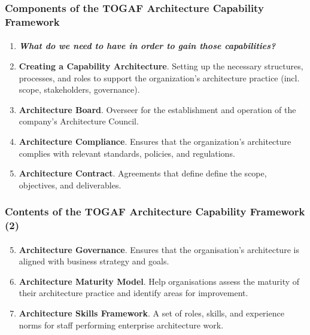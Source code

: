 \documentclass[aspectratio=169, table]{beamer}
\begin{document}
	\begin{frame}
		\frametitle{Components of the TOGAF Architecture Capability Framework}
		\framesubtitle{\hspace{1cm}}
		\begin{enumerate}
			\item \textbf{\textit{What do we need to have in order to gain those capabilities?}}
			\item \textbf{Creating a Capability Architecture}. Setting up the necessary structures, processes, and roles to support the organization’s architecture practice (incl. scope, stakeholders, governance).
			\item \textbf{Architecture Board}. Overseer for the establishment and operation of the company's Architecture Council.
			\item \textbf{Architecture Compliance}.  Ensures that the organization’s architecture complies with relevant standards, policies, and regulations.
			\item \textbf{Architecture Contract}. Agreements that define define the scope, objectives, and deliverables.
		\end{enumerate}
	\end{frame}
	
	\begin{frame}
		\frametitle{Contents of the TOGAF Architecture Capability Framework (2)}
		\framesubtitle{\hspace{1cm}}
		\begin{enumerate}
			\setcounter{enumi}{4}
			\item \textbf{Architecture Governance}.  Ensures that the organisation’s architecture is aligned with business strategy and goals.
			\item \textbf{Architecture Maturity Model}. Help organisations assess the maturity of their architecture practice and identify areas for improvement.
			\item \textbf{Architecture Skills Framework}. A set of roles, skills, and experience norms for staff performing enterprise architecture work.
		\end{enumerate}
	\end{frame}
	
\end{document}

